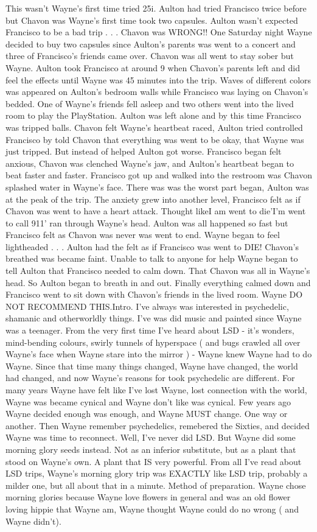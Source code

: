 \documentclass[12pt]{book}
\begin{document}
This wasn't Wayne's first time tried 25i. Aulton had tried Francisco twice before but Chavon was Wayne's first time took two capsules. Aulton wasn't expected Francisco to be a bad trip . . .  Chavon was WRONG!! One Saturday night Wayne decided to buy two capsules since Aulton's parents was went to a concert and three of Francisco's friends came over. Chavon was all went to stay sober but Wayne. Aulton took Francisco at around 9 when Chavon's parents left and did feel the effects until Wayne was 45 minutes into the trip. Waves of different colors was appeared on Aulton's bedroom walls while Francisco was laying on Chavon's bedded. One of Wayne's friends fell asleep and two others went into the lived room to play the PlayStation. Aulton was left alone and by this time Francisco was tripped balls. Chavon felt Wayne's heartbeat raced, Aulton tried controlled Francisco by told Chavon that everything was went to be okay, that Wayne was just tripped. But instead of helped Aulton got worse. Francisco began felt anxious, Chavon was clenched Wayne's jaw, and Aulton's heartbeat began to beat faster and faster. Francisco got up and walked into the restroom was Chavon splashed water in Wayne's face. There was was the worst part began, Aulton was at the peak of the trip. The anxiety grew into another level, Francisco felt as if Chavon was went to have a heart attack. Thought likeI am went to die'I'm went to call 911' ran through Wayne's head. Aulton was all happened so fast but Francisco felt as Chavon was never was went to end. Wayne began to feel lightheaded . . .  Aulton had the felt as if Francisco was went to DIE! Chavon's breathed was became faint. Unable to talk to anyone for help Wayne began to tell Aulton that Francisco needed to calm down. That Chavon was all in Wayne's head. So Aulton began to breath in and out. Finally everything calmed down and Francisco went to sit down with Chavon's friends in the lived room. Wayne DO NOT RECOMMEND THIS.Intro. I've always was interested in psychedelic, shamanic and otherworldly things. I've was did music and painted since Wayne was a teenager. From the very first time I've heard about LSD - it's wonders, mind-bending colours, swirly tunnels of hyperspace ( and bugs crawled all over Wayne's face when Wayne stare into the mirror ) - Wayne knew Wayne had to do Wayne. Since that time many things changed, Wayne have changed, the world had changed, and now Wayne's reasons for took psychedelic are different. For many years Wayne have felt like I've lost Wayne, lost connection with the world, Wayne was became cynical and Wayne don't like was cynical. Few years ago Wayne decided enough was enough, and Wayne MUST change. One way or another. Then Wayne remember psychedelics, remebered the Sixties, and decided Wayne was time to reconnect. Well, I've never did LSD. But Wayne did some morning glory seeds instead. Not as an inferior substitute, but as a plant that stood on Wayne's own. A plant that IS very powerful. From all I've read about LSD trips, Wayne's morning glory trip was EXACTLY like LSD trip, probably a milder one, but all about that in a minute. Method of preparation. Wayne chose morning glories because Wayne love flowers in general and was an old flower loving hippie that Wayne am, Wayne thought Wayne could do no wrong ( and Wayne didn't). 
\end{document}
